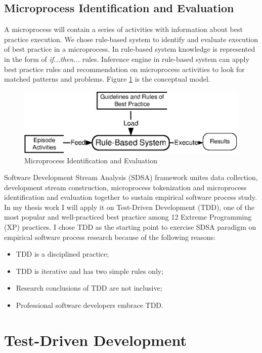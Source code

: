 \subsection{Microprocess Identification and Evaluation}
A microprocess will contain a series of activities with information about
best practice execution. We chose rule-based system to identify and evaluate
execution of best practice in a microprocess. In rule-based system
knowledge is represented in the form of \textit{if...then...}
rules\cite{Luger:02}. Inference engine in rule-based system can apply best
practice rules and recommendation on microprocess activities to look for
matched patterns and problems. Figure \ref{fig:concept} is the conceptual 
model.
\begin{figure}[h]
  \centering
  \includegraphics{figs/ConceptStructure.eps}
  \caption{Microprocess Identification and Evaluation}\label{fig:concept}
\end{figure} 

Software Development Stream Analysis (SDSA) framework unites data
collection, development stream construction, microprocess tokenization and
microprocess identification and evaluation together to sustain empirical
software process study. In my thesis work I will apply it on Test-Driven
Development (TDD), one of the most popular and well-practiced best practice
among 12 Extreme Programming (XP) practices. I chose TDD as the starting point
to exercise SDSA paradigm on empirical software process research because of
the following reasons: 
\begin{itemize}
\item {TDD is a disciplined practice;}
\item {TDD is iterative and has two simple rules only;}
\item {Research conclusions of TDD are not inclusive;}
\item {Professional software developers embrace TDD.}
\end{itemize}

\section{Test-Driven Development}
